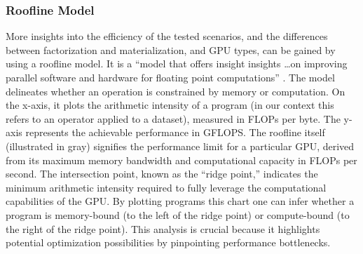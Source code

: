 \subsubsection*{Roofline Model}
More insights into the efficiency of the tested scenarios, and the differences between factorization and materialization, and GPU types, can be gained by using a roofline model. It is a “model that offers insight insights \ldots on improving parallel software and hardware for floating point computations” \cite{roofline}. The model delineates whether an operation is constrained by memory or computation. On the x-axis, it plots the arithmetic intensity of a program (in our context this refers to an operator applied to a dataset), measured in FLOPs per byte. The y-axis represents the achievable performance in GFLOPS. The roofline itself (illustrated in gray) signifies the performance limit for a particular GPU, derived from its maximum memory bandwidth and computational capacity in FLOPs per second. The intersection point, known as the ``ridge point,'' indicates the minimum arithmetic intensity required to fully leverage the computational capabilities of the GPU. By plotting programs this chart one can infer whether a program is memory-bound (to the left of the ridge point) or compute-bound (to the right of the ridge point). This analysis is crucial because it highlights potential optimization possibilities by pinpointing performance bottlenecks.



